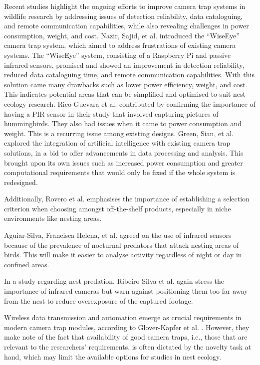 \documentclass[class=report,11pt,crop=false]{standalone}
\begin{document}
Recent studies highlight the ongoing efforts to improve camera trap systems in wildlife research by addressing issues of detection reliability, data cataloguing, and remote communication capabilities, while also revealing challenges in power consumption, weight, and cost. Nazir, Sajid, et al. \cite{nazir2017wiseeye} introduced the “WiseEye” camera trap system, which aimed to address frustrations of existing camera systems. The “WiseEye” system, consisting of a Raspberry Pi and passive infrared sensors, promised and showed an improvement in detection reliability, reduced data cataloguing time, and remote communication capabilities. With this solution came many drawbacks such as lower power efficiency, weight, and cost. This indicates potential areas that can be simplified and optimised to suit nest ecology research. Rico-Guevara et al. \cite{rico-guevara2017bring} contributed by confirming the importance of having a PIR sensor in their study that involved capturing pictures of hummingbirds. They also had issues when it came to power consumption and weight. This is a recurring issue among existing designs. Green, Sian, et al. \cite{green2020innovations} explored the integration of artificial intelligence with existing camera trap solutions, in a bid to offer advancements in data processing and analysis. This brought upon its own issues such as increased power consumption and greater computational requirements that would only be fixed if the whole system is redesigned. 


Additionally, Rovero et al. \cite{rovero2013which} emphasises the importance of establishing a selection criterion when choosing amongst off-the-shelf products, especially in niche environments like nesting areas.

Aguiar-Silva, Francisca Helena, et al. \cite{aguiar-silva2017camera} agreed on the use of infrared sensors because of the prevalence of nocturnal predators that attack nesting areas of birds. This will make it easier to analyse activity regardless of night or day in confined areas.

In a study regarding nest predation, Ribeiro-Silva et al. \cite{ribeiro-silva2018testing} again stress the importance of infrared cameras but warn against positioning them too far away from the nest to reduce overexposure of the captured footage.

Wireless data transmission and automation emerge as crucial requirements in modern camera trap modules, according to Glover-Kapfer et al. \cite{glover2019camera}. However, they make note of the fact that availability of good camera traps, i.e., those that are relevant to the researchers’ requirements, is often dictated by the novelty task at hand, which may limit the available options for studies in nest ecology.  
\end{document}
